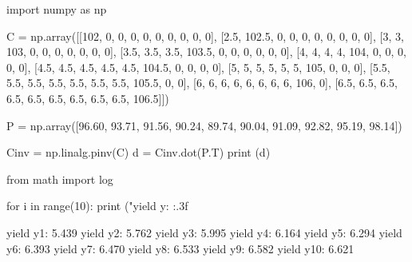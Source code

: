\cprotEnv\begin{solution}
\begin{ipython}
import numpy as np

C = np.array([[102, 0, 0, 0, 0, 0, 0, 0, 0, 0],
              [2.5, 102.5, 0, 0, 0, 0, 0, 0, 0, 0],
              [3, 3, 103, 0, 0, 0, 0, 0, 0, 0],
              [3.5, 3.5, 3.5, 103.5, 0, 0, 0, 0, 0, 0],
              [4, 4, 4, 4, 104, 0, 0, 0, 0, 0],
              [4.5, 4.5, 4.5, 4.5, 4.5, 104.5, 0, 0, 0, 0],
              [5, 5, 5, 5, 5, 5, 105, 0, 0, 0],
              [5.5, 5.5, 5.5, 5.5, 5.5, 5.5, 5.5, 105.5, 0, 0],
              [6, 6, 6, 6, 6, 6, 6, 6, 106, 0],
              [6.5, 6.5, 6.5, 6.5, 6.5, 6.5, 6.5, 6.5, 6.5, 106.5]])

P = np.array([96.60, 93.71, 91.56, 90.24, 89.74, 
              90.04, 91.09, 92.82, 95.19, 98.14])

Cinv = np.linalg.pinv(C)
d = Cinv.dot(P.T)
print (d)
\end{ipython}
\begin{ioutput}
[0.94705882 0.89114491 0.83539212 0.7814726  0.72999737 0.68140865
 0.63578693 0.59296268 0.55300618 0.51574181]
\end{ioutput}

\begin{ipython}
from math import log

for i in range(10):
    print ("yield y{}: {:.3f}%
\end{ipython}
\begin{ioutput}
yield y1: 5.439%
yield y2: 5.762%
yield y3: 5.995%
yield y4: 6.164%
yield y5: 6.294%
yield y6: 6.393%
yield y7: 6.470%
yield y8: 6.533%
yield y9: 6.582%
yield y10: 6.621%
\end{ioutput}
\end{solution}
